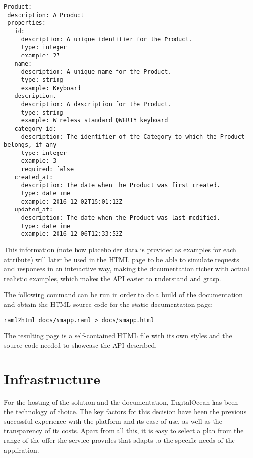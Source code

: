 \begin{verbatim}
Product:
 description: A Product
 properties:
   id:
     description: A unique identifier for the Product.
     type: integer
     example: 27
   name:
     description: A unique name for the Product.
     type: string
     example: Keyboard
   description:
     description: A description for the Product.
     type: string
     example: Wireless standard QWERTY keyboard
   category_id:
     description: The identifier of the Category to which the Product belongs, if any.
     type: integer
     example: 3
     required: false
   created_at:
     description: The date when the Product was first created.
     type: datetime
     example: 2016-12-02T15:01:12Z
   updated_at:
     description: The date when the Product was last modified.
     type: datetime
     example: 2016-12-06T12:33:52Z
\end{verbatim}

This information (note how placeholder data is provided as examples for each attribute) will later be used in the HTML page to be able to simulate requests and responses in an interactive way, making the documentation richer with actual realistic examples, which makes the API easier to understand and grasp.

The following command can be run in order to do a build of the documentation and obtain the HTML source code for the static documentation page:

\begin{verbatim}
raml2html docs/smapp.raml > docs/smapp.html
\end{verbatim}

The resulting page is a self-contained HTML file with its own styles and the source code needed to showcase the API described.

\section{Infrastructure}
For the hosting of the solution and the documentation, DigitalOcean has been the technology of choice. The key factors for this decision have been the previous successful experience with the platform  and its ease of use, as well as the transparency of its costs. Apart from all this, it is easy to select a plan from the range of the offer the service provides that adapts to the specific needs of the application.

